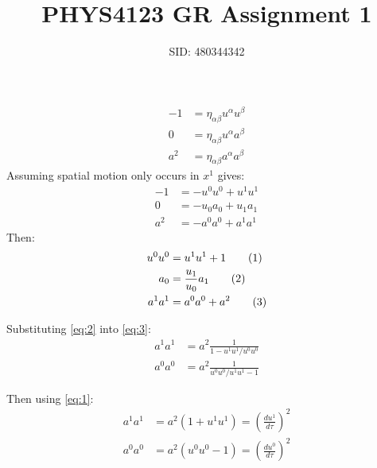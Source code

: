 \documentclass[a4paper]{article}
\title{PHYS4123 GR Assignment 1}
\author{SID: 480344342}
\newcommand{\horln}{\vspace{-6mm}\begin{flushleft}\mbox{}\hrulefill\mbox{}
	\end{flushleft}\vspace{-6mm}}
\newcommand\eq{\addtocounter{equation}{1}\tag{\theequation}}
\begin{document}

\maketitle
\horln

\setcounter{page}{1}


\section{}
\subsection{}
\begin{align*}-1 &= \eta_{\alpha \beta} u^\alpha u^\beta\\
0 &= \eta_{\alpha \beta} u^\alpha a^\beta \\
a^2 &= \eta_{\alpha \beta} a^\alpha a^\beta
\end{align*}
Assuming spatial motion only occurs in $x^1$ gives:
\begin{align*}
-1 &= -u^0u^0 + u^1u^1\\
0 &= -u_0a_0 + u_1 a_1\\
a^2 &= -a^0a^0 + a^1a^1
\end{align*}
Then:
\begin{align*}
u^0u^0 &= u^1u^1 + 1 \eq \label{eq:1}\\
a_0 &= \frac{u_1}{u_0} a_1 \eq \label{eq:2}\\
a^1a^1 &= a^0a^0 + a^2 \eq \label{eq:3}
\end{align*}

Substituting \eqref{eq:2} into \eqref{eq:3}:
\begin{align*}
a^1a^1 &= a^2 \frac{1}{1-u^1u^1/u^0u^0}\\
a^0a^0 &= a^2 \frac{1}{u^0u^0/u^1u^1 - 1}
\end{align*}

Then using \eqref{eq:1}:
\begin{align*}
a^1a^1 &= a^2 (1 + u^1 u^1) = \left(\frac{du^1}{d\tau}\right)^2\\
a^0a^0 &=  a^2 (u^0 u^0 - 1) =  \left(\frac{du^0}{d\tau}\right)^2
\end{align*}
\end{document}
